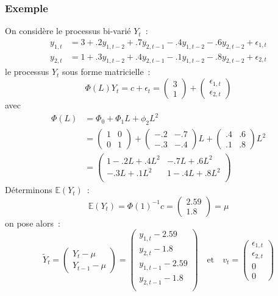 \documentclass[11pt]{scrartcl} %
\newcommand{\E}[1]{\mathbb{E}\left(#1\right)}
\begin{document}
\subsubsection*{Exemple}
On considère le processus bi-varié $Y_t$~:
\begin{align*}
y_{1,t}&=3+ .2y_{1,t-2}+.7y_{2,t-1}-.4y_{1,t-2}-.6y_{2,t-2}+\epsilon_{1,t}\\
y_{2,t}&=1+ .3y_{1,t-2}+.4y_{2,t-1}-.1y_{1,t-2}-.8y_{2,t-2}+\epsilon_{2,t}
\end{align*}
le processus $Y_t$ sous forme matricielle~:
$$
\Phi(L)Y_t = c +\epsilon_t =
 \left(
\begin{array}{c}
3\\
1
\end{array}
\right)+
\left(
\begin{array}{c}
\epsilon_{1,t}\\
\epsilon_{2,t}
\end{array}
\right)
$$
avec 
\begin{align*}
\Phi(L)&=\Phi_0+\Phi_1L+\phi_2L^2\\
&=\left(
\begin{array}{cc}
1 & 0\\
0 & 1
\end{array}
\right) + 
\left(
\begin{array}{cc}
-.2 & -.7\\
-.3 & -.4
\end{array}
\right)L +
\left(
\begin{array}{cc}
.4 & .6\\
.1 & .8
\end{array}
\right)L^2 \\
&= \left( \begin{array}{cc}
1-.2L+.4L^2 & -.7L+.6L^2\\
-.3L+.1L^2 & 1-.4L+.8L^2\\
\end{array}
\right)
\end{align*}
Déterminons $\E{Y_t}$~:
$$
\E{Y_t} = \Phi(1)^{-1}c=\left(
\begin{array}{c}
2.59\\
1.8
\end{array}
\right)=\mu
$$
on pose alors~:
$$
\tilde{Y}_t = \left(
\begin{array}{c}
Y_t-\mu\\
Y_{t-1}-\mu
\end{array}
\right)=
\left(
\begin{array}{c}
y_{1,t}-2.59\\
y_{2,t}-1.8\\
y_{1,t-1}-2.59\\
y_{2,t-1}-1.8\\
\end{array}
\right)\quad \textrm{et}\quad v_t=\left(\begin{array}{c}
\epsilon_{1,t}\\
\epsilon_{2,t}\\
0\\
0
\end{array}\right)
$$
\end{document}
